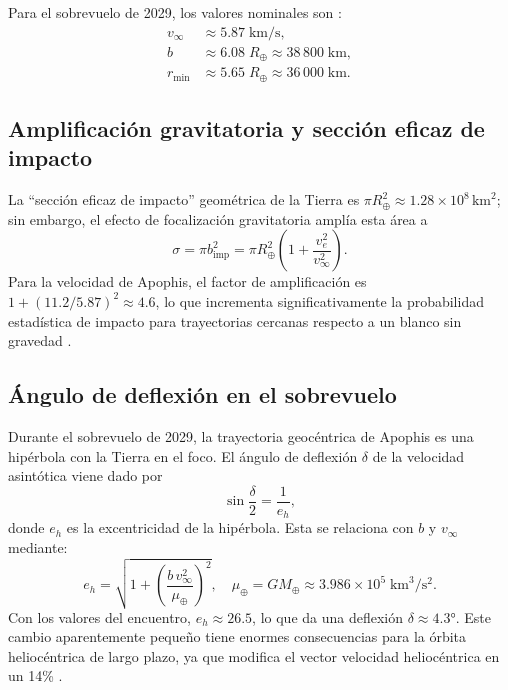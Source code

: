\documentclass[a4paper]{article}
\begin{document}
Para el sobrevuelo de 2029, los valores nominales son \cite{chesley2005keyholes, farnocchia2023orbit}:
\begin{align}
  v_\infty &\approx 5.87\;\text{km/s}, \\
  b         &\approx 6.08\;R_\oplus \approx 38\,800\;\text{km}, \\
  r_\text{min} &\approx 5.65\;R_\oplus \approx 36\,000\;\text{km}.
\end{align}

\subsection{Amplificación gravitatoria y sección eficaz de impacto}

La ``sección eficaz de impacto'' geométrica de la Tierra es $\pi R_\oplus^2 \approx 1.28 \times 10^8\,\text{km}^2$; sin embargo, el efecto de focalización gravitatoria amplía esta área a
\begin{equation}
  \sigma = \pi b_\text{imp}^2 = \pi R_\oplus^2 \left(1 + \frac{v_e^2}{v_\infty^2}\right).
\end{equation}
Para la velocidad de Apophis, el factor de amplificación es $1 + (11.2/5.87)^2 \approx 4.6$, lo que incrementa significativamente la probabilidad estadística de impacto para trayectorias cercanas respecto a un blanco sin gravedad \cite{murray1999solar, valsecchi2003resonant}.

\subsection{Ángulo de deflexión en el sobrevuelo}

Durante el sobrevuelo de 2029, la trayectoria geocéntrica de Apophis es una hipérbola con la Tierra en el foco. El ángulo de deflexión $\delta$ de la velocidad asintótica viene dado por
\begin{equation}
  \sin\frac{\delta}{2} = \frac{1}{e_h},
\end{equation}
donde $e_h$ es la excentricidad de la hipérbola. Esta se relaciona con $b$ y $v_\infty$ mediante:
\begin{equation}
  e_h = \sqrt{1 + \left(\frac{b\,v_\infty^2}{\mu_\oplus}\right)^2},
  \quad \mu_\oplus = GM_\oplus \approx 3.986\times10^5\;\text{km}^3/\text{s}^2.
\end{equation}
Con los valores del encuentro, $e_h \approx 26.5$, lo que da una deflexión $\delta \approx 4.3°$. Este cambio aparentemente pequeño tiene enormes consecuencias para la órbita heliocéntrica de largo plazo, ya que modifica el vector velocidad heliocéntrica en un 14\% \cite{scheeres2023proximity, vallejo2022conditions}.
\end{document}
